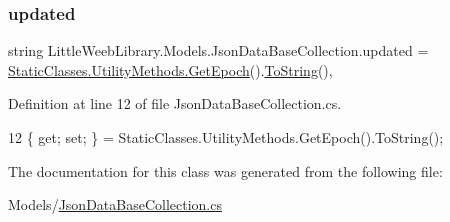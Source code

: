 \subsubsection{\texorpdfstring{updated}{updated}}
{\footnotesize\ttfamily string Little\+Weeb\+Library.\+Models.\+Json\+Data\+Base\+Collection.\+updated = \mbox{\hyperlink{class_little_weeb_library_1_1_static_classes_1_1_utility_methods_a12336d9e64983ddabaad8950486fafb2}{Static\+Classes.\+Utility\+Methods.\+Get\+Epoch}}().\mbox{\hyperlink{class_little_weeb_library_1_1_models_1_1_json_data_base_collection_ac50c3070bcc5af0ca9f223bb88a1ef6c}{To\+String}}()\hspace{0.3cm}{\ttfamily [get]}, {\ttfamily [set]}}



Definition at line 12 of file Json\+Data\+Base\+Collection.\+cs.


\begin{DoxyCode}
12 \{ \textcolor{keyword}{get}; \textcolor{keyword}{set}; \} = StaticClasses.UtilityMethods.GetEpoch().ToString();
\end{DoxyCode}


The documentation for this class was generated from the following file\+:\begin{DoxyCompactItemize}
\item 
Models/\mbox{\hyperlink{_json_data_base_collection_8cs}{Json\+Data\+Base\+Collection.\+cs}}\end{DoxyCompactItemize}
